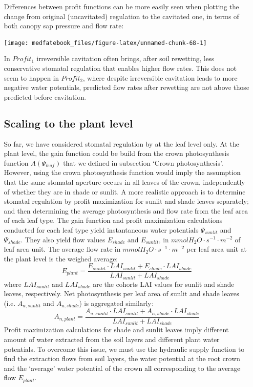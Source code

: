 \documentclass[]{book}
\begin{document}
Differences between profit functions can be more easily seen when plotting the change from original (uncavitated) regulation to the cavitated one, in terms of both canopy sap pressure and flow rate:

\begin{center}\texttt{[image: medfatebook\_files/figure-latex/unnamed-chunk-68-1]} \end{center}

In \(Profit_1\) irreversible cavitation often brings, after soil rewetting, less conservative stomatal regulation that enables higher flow rates. This does not seem to happen in \(Profit_2\), where despite irreversible cavitation leads to more negative water potentials, predicted flow rates after rewetting are not above those predicted before cavitation.

\hypertarget{scaling-to-the-plant-level}{%
\subsection{Scaling to the plant level}\label{scaling-to-the-plant-level}}

So far, we have considered stomatal regulation by at the leaf level only. At the plant level, the gain function could be build from the crown photosynthesis function \(A(\Psi_{leaf})\) that we defined in subsection `Crown photosynthesis'. However, using the crown photosynthesis function would imply the assumption that the same stomatal aperture occurs in all leaves of the crown, independently of whether they are in shade or sunlit. A more realistic approach is to determine stomatal regulation by profit maximization for sunlit and shade leaves separately; and then determining the average photosynthesis and flow rate from the leaf area of each leaf type. The gain function and profit maximization calculations conducted for each leaf type yield instantaneous water potentials \(\Psi_{sunlit}\) and \(\Psi_{shade}\). They also yield flow values \(E_{shade}\) and \(E_{sunlit}\), in \(mmol H_2O \cdot s^{-1} \cdot m^{-2}\) of leaf area unit. The average flow rate in \(mmol H_2O \cdot s^{-1} \cdot m^{-2}\) per leaf area unit at the plant level is the weighed average:
\begin{equation}
 E_{plant} = \frac{E_{sunlit} \cdot LAI_{sunlit} + E_{shade} \cdot LAI_{shade}}{LAI_{sunlit} + LAI_{shade}}
\end{equation}
where \(LAI_{sunlit}\) and \(LAI_{shade}\) are the cohorts LAI values for sunlit and shade leaves, respectively. Net photosynthesis per leaf area of sunlit and shade leaves (i.e. \(A_{n,sunlit}\) and \(A_{n,shade}\)) is aggregated similarly:
\begin{equation}
 A_{n, plant} = \frac{A_{n,sunlit} \cdot LAI_{sunlit} + A_{n,shade} \cdot LAI_{shade}}{LAI_{sunlit} + LAI_{shade}}
\end{equation}
Profit maximization calculations for shade and sunlit leaves imply different amount of water extracted from the soil layers and different plant water potentials. To overcome this issue, we must use the hydraulic supply function to find the extraction flows from soil layers, the water potential at the root crown and the `average' water potential of the crown all corresponding to the average flow \(E_{plant}\).
\end{document}
